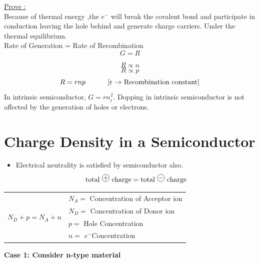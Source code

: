 \documentclass[a4aper,12pt]{report}
\begin{document}
\underline{Prove :}\\
 Because of thermal energy ,the $e^-$ will break the covalent bond and participate in conduction leaving the hole behind and generate charge carriers.
 Under the thermal equilibrium.\\
 \hspace*{3cm}Rate of Generation = Rate of Recombination\\
 $$G=R$$
 
 \[R\propto n \]
 \[R\propto p \]
\[R=rnp \text{\hspace*{1cm} [r $\rightarrow$ Recombination constant]}\] 
In intrinsic semiconductor, $G=rn_i^2$. Dopping in intrinsic semiconductor is not affected by the generation of holes or electrons.
\section{Charge Density in a Semiconductor}
\begin{itemize}
    \item Electrical neutrality is satisfied by semiconductor also. $$\text{total \begin{tikzpicture}
        \node[draw, circle, inner sep=0pt] (ion) at (0,0) {$+$};
    \end{tikzpicture} charge} = \text{total \begin{tikzpicture}
        \node[draw, circle, inner sep=0pt] (ion) at (0,0) {$-$};
    \end{tikzpicture} charge} $$ 
\end{itemize}
\begin{center}
    \begin{tabular}{c|l}
    \multirow{4}{*}{$N_D + p = N_A + n$}\quad  & \quad $N_A = $ Concentration of Acceptor ion \\
    & \quad $N_D = $ Concentration of Donor ion \\ 
    & \quad $p = $ Hole Concentration \\
    & \quad $n = $ $e^-$Concentration \\  
\end{tabular}
\end{center}
\textbf{Case 1: Consider n-type material} 
\end{document}
